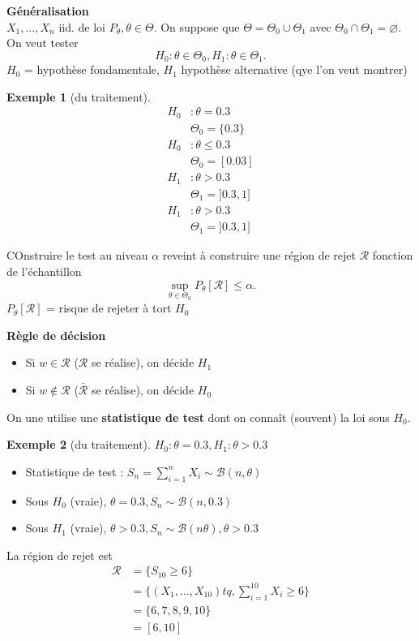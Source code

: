 \documentclass{article}
\theoremstyle{plain}%
\theoremstyle{definition}
\newtheorem{exmp}{Exemple}[section]
\theoremstyle{remark}
\begin{document}
\textbf{Généralisation} \\
$ X_1, \dots, X_n $ iid. de loi $ P_\theta , \theta \in \Theta  $. On suppose que $ \Theta = \Theta _0 \cup \Theta _1 $ avec $ \Theta _0 \cap \Theta _1 = \varnothing $. On veut tester 
\[
    H_0: \theta \in \Theta_0, H_1: \theta \in \Theta _1
.\]
$ H_0 $ = hypothèse fondamentale, $ H_1 $ hypothèse alternative (qye l'on veut montrer)
\begin{exmp}[du traitement]
    \begin{align*}
        H_0 &: \theta = 0.3 \\
            & \Theta _0 = \{0.3\} \\
        H_0 &: \theta \leq 0.3 \\
            &\Theta _0 = [0.03] \\
        H_1 &: \theta > 0.3 \\
            &\Theta _1 = ]0.3,1] \\
        H_1 &:\theta > 0.3 \\
            &\Theta _1 = ]0.3,1]
    \end{align*}
\end{exmp}

COnstruire le test au niveau $ \alpha  $ reveint à construire une région de rejet $ \mathcal{R} $ fonction de l'échantillon 
\[
    \sup _{\theta \in \Theta _0} P_\theta [\mathcal{R}]\leq \alpha 
.\]
$ P_\theta [\mathcal{R}] $ = risque de rejeter à tort $ H_0 $ 

\textbf{Règle de décision}\begin{itemize}
    \item Si $ w \in \mathcal{R} $ ($ \mathcal{R} $ se réalise), on décide $ H_1 $
    \item Si $ w \not\in \mathcal{R}  $ ($ \bar{\mathcal{R}} $ se réalise), on décide $ H_0 $ 
\end{itemize}
On une utilise une \textbf{statistique de test} dont on connaît (souvent) la loi sous $ H_0 $.
\begin{exmp}[du traitement]
    $ H_0: \theta =0.3, H_1: \theta >0.3 $ \begin{itemize}
        \item Statistique de test : $ S_n = \sum_{i=1}^{n}X_i \sim \mathcal{B}(n, \theta ) $ \\
        \item Sous $ H_0 $ (vraie), $ \theta = 0.3, S_n \sim \mathcal{B}(n,0.3) $ \\
        \item Sous $ H_1 $ (vraie), $ \theta > 0.3, S_n \sim \mathcal{B}(n \theta), \theta >0.3$ \\
    \end{itemize}
        La région de rejet est \begin{align*}
            \mathcal{R} &= \{S_{10} \geq 6\} \\
                        &= \{(X_1, \dots, X_10) tq, \sum_{i=1}^{10}X_i \geq 6\} \\
                        &= \{6,7,8,9,10\} \\
                        &= [6,10]
        \end{align*}
\end{exmp}
\end{document}
